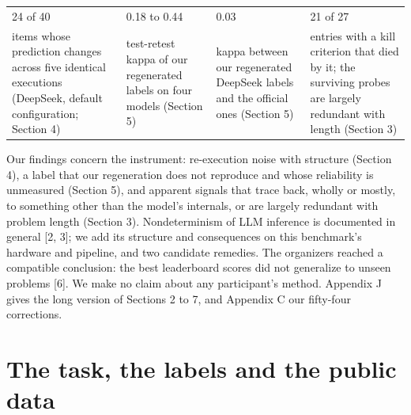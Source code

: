 \documentclass{article}
\begin{document}
\begin{center}
\setlength{\tabcolsep}{5pt}
\begin{tabular}{@{}L{3.2cm}L{3.2cm}L{3.2cm}L{3.2cm}@{}}
\toprule
{\LARGE 24 of 40} & {\LARGE 0.18 to 0.44} & {\LARGE 0.03} & {\LARGE 21 of 27} \\[2pt]
\footnotesize items whose prediction changes across five identical executions (DeepSeek, default configuration; Section 4) & \footnotesize test-retest kappa of our regenerated labels on four models (Section 5) & \footnotesize kappa between our regenerated DeepSeek labels and the official ones (Section 5) & \footnotesize entries with a kill criterion that died by it; the surviving probes are largely redundant with length (Section 3) \\
\bottomrule
\end{tabular}
\end{center}

Our findings concern the instrument: re-execution noise with structure (Section 4), a label that our regeneration does not reproduce and whose reliability is unmeasured (Section 5), and apparent signals that trace back, wholly or mostly, to something other than the model's internals, or are largely redundant with problem length (Section 3). Nondeterminism of LLM inference is documented in general [2, 3]; we add its structure and consequences on this benchmark's hardware and pipeline, and two candidate remedies. The organizers reached a compatible conclusion: the best leaderboard scores did not generalize to unseen problems [6]. We make no claim about any participant's method. Appendix J gives the long version of Sections 2 to 7, and Appendix C our fifty-four corrections.

\section{The task, the labels and the public data}\label{sec:2}
\end{document}
